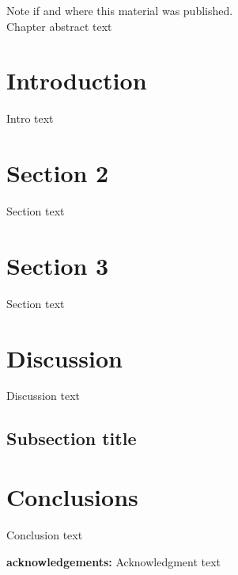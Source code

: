 \label{ch1}

\noindent Note if and where this material was published. \\

Chapter abstract text

\section{Introduction}

Intro text \citep{Dawson:2012dl}

\section{Section 2}

Section text \citet{Bradac:2008gw}

\section{Section 3}

Section text

\section{Discussion}

Discussion text

\subsection{Subsection title}

\section{Conclusions}

Conclusion text

\textbf{acknowledgements:}
Acknowledgment text

%



%
%  
